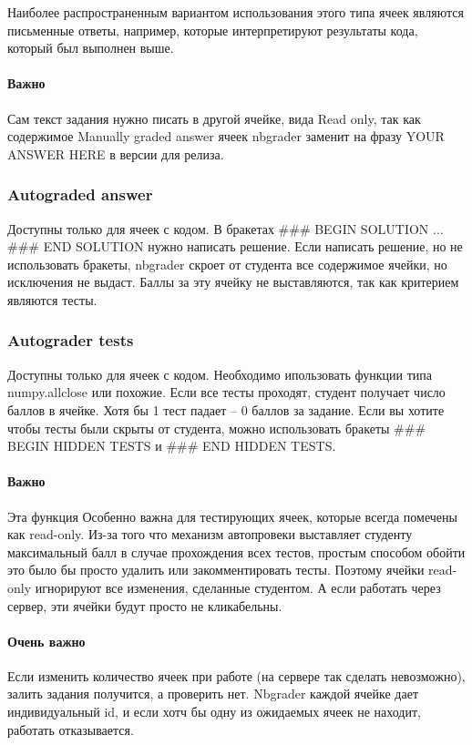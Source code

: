 \documentclass[a4paper,12pt]{article}
\begin{document}
Наиболее распространенным вариантом использования этого типа ячеек являются письменные ответы, например, которые интерпретируют результаты кода, который был выполнен выше.

\paragraph{Важно}Сам текст задания нужно писать в другой ячейке, вида Read only, так как содержимое Manually graded answer ячеек nbgrader заменит на фразу YOUR ANSWER HERE в версии для релиза.

\subsubsection{Autograded answer}

Доступны только для ячеек с кодом. В бракетах \#\#\# BEGIN SOLUTION ... \#\#\# END SOLUTION нужно написать решение. 
Если написать решение, но не использовать бракеты, nbgrader скроет от студента все содержимое ячейки, но исключения не выдаст. Баллы за эту ячейку не выставляются, так как критерием являются тесты. 

\subsubsection{Autograder tests}

Доступны только для ячеек с кодом. Необходимо ипользовать функции типа numpy.allclose или похожие. Если все тесты проходят, студент получает число баллов в ячейке. Хотя бы 1 тест падает -- 0 баллов за задание.
Если вы хотите чтобы тесты были скрыты от студента, можно использовать бракеты \#\#\# BEGIN HIDDEN TESTS и \#\#\# END HIDDEN TESTS.

\paragraph{Важно}
Эта функция Особенно важна для тестирующих ячеек, которые всегда помечены как read-only. Из-за того что механизм автопровеки выставляет студенту максимальный балл в случае прохождения всех тестов, простым способом обойти это было бы просто удалить или закомментировать тесты. Поэтому ячейки read-only игнорируют все изменения, сделанные студентом. А если работать через сервер, эти ячейки будут просто не кликабельны.

\paragraph{Очень важно}
Если изменить количество ячеек при работе (на сервере так сделать невозможно), залить задания получится, а проверить нет. Nbgrader каждой ячейке дает индивидуальный id, и если хотч бы одну из ожидаемых ячеек не находит, работать отказывается.
\end{document}
